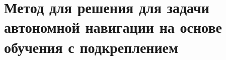 \chapter{Метод для решения для задачи автономной навигации на основе обучения с подкреплением}\label{ch:ch3}






